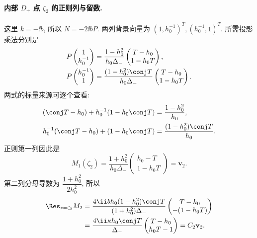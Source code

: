 \paragraph{内部 $D_+$ 点 $\zeta_2$ 的正则列与留数.}
这里 $k=-\ii b$, 所以 $N=-2\ii bP$.
两列背景向量为 $(1,h_0^{-1})^T,(h_0^{-1},1)^T$.
所需投影乘法分别是
\[
\begin{aligned}
P\begin{pmatrix}1\\h_0^{-1}\end{pmatrix}
&=\dfrac{1-h_0^2}{h_0\Delta_-}
\begin{pmatrix}T-h_0\\1-h_0T\end{pmatrix},\\
P\begin{pmatrix}h_0^{-1}\\1\end{pmatrix}
&=\dfrac{(1-h_0^2)\conj T}{h_0\Delta_-}
\begin{pmatrix}T-h_0\\1-h_0T\end{pmatrix}.
\end{aligned}
\]
两式的标量来源可逐个查看:
\[
\begin{aligned}
(\conj T-h_0)+h_0^{-1}(1-h_0\conj T)
&=\dfrac{1-h_0^2}{h_0},\\
h_0^{-1}(\conj T-h_0)+(1-h_0\conj T)
&=\dfrac{(1-h_0^2)\conj T}{h_0}.
\end{aligned}
\]
正则第一列因此是
\[
M_1(\zeta_2)
=\dfrac{1+h_0^2}{h_0\Delta_-}
\begin{pmatrix}h_0-T\\1-h_0T\end{pmatrix}
=\mathbf v_2.
\]
第二列分母导数为 $\dfrac{1+h_0^2}{2h_0^2}$, 所以
\[
\begin{aligned}
\Res_{z=\zeta_2}M_2
&=\dfrac{4\ii b h_0(1-h_0^2)\conj T}
{(1+h_0^2)\Delta_-}
\begin{pmatrix}T-h_0\\-(1-h_0T)\end{pmatrix}\\
&=\dfrac{4\ii\kappa h_0\conj T}{\Delta_-}
\begin{pmatrix}T-h_0\\h_0T-1\end{pmatrix}
=C_2\mathbf v_2.
\end{aligned}
\]

